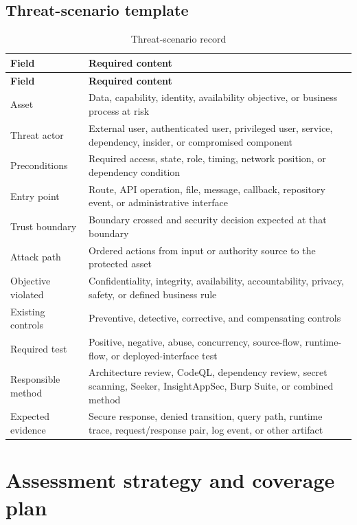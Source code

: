 \documentclass[11pt,letterpaper]{article}
\begin{document}
\subsection{Threat-scenario template}

\begin{longtable}{@{}L{1.35in}L{5.35in}@{}}
\caption{Threat-scenario record}\label{tab:threat-template}\\
\toprule
\textbf{Field} & \textbf{Required content} \\
\midrule
\endfirsthead
\toprule
\textbf{Field} & \textbf{Required content} \\
\midrule
\endhead
Asset & Data, capability, identity, availability objective, or business process at risk \\
Threat actor & External user, authenticated user, privileged user, service, dependency, insider, or compromised component \\
Preconditions & Required access, state, role, timing, network position, or dependency condition \\
Entry point & Route, API operation, file, message, callback, repository event, or administrative interface \\
Trust boundary & Boundary crossed and security decision expected at that boundary \\
Attack path & Ordered actions from input or authority source to the protected asset \\
Objective violated & Confidentiality, integrity, availability, accountability, privacy, safety, or defined business rule \\
Existing controls & Preventive, detective, corrective, and compensating controls \\
Required test & Positive, negative, abuse, concurrency, source-flow, runtime-flow, or deployed-interface test \\
Responsible method & Architecture review, CodeQL, dependency review, secret scanning, Seeker, InsightAppSec, Burp Suite, or combined method \\
Expected evidence & Secure response, denied transition, query path, runtime trace, request/response pair, log event, or other artifact \\
\bottomrule
\end{longtable}

\section{Assessment strategy and coverage plan}
\end{document}
